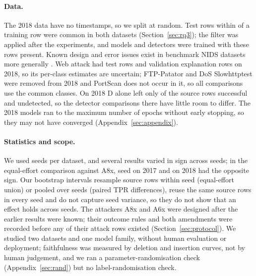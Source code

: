 \paragraph{Data.}
The 2018 data have no timestamps, so we split at random.
Test rows within \paramNDThr{} of a training row were common in both datasets (Section~\ref{sec:rq3}); the filter was
applied after the experiments, and models and detectors were trained with these rows present.
Known design and error issues exist in benchmark NIDS datasets more generally \cite{flood2024,lanvin2022}.
Web attack had \nWebTestEighteen{} test rows and \nWebValEighteen{} validation explanation rows on 2018, so its per-class
estimates are uncertain; FTP-Patator and DoS Slowhttptest were removed from 2018 and PortScan does not occur in it, so
all comparisons use the \nCommonClasses{} common classes.
On 2018 D alone left only \axHeadVoneEighteenD{} of the source rows successful and undetected, so the detector
comparisons there have little room to differ.
The 2018 models ran to the maximum number of epochs without early stopping, so they may not have converged
(Appendix~\ref{sec:appendix}).

\paragraph{Statistics and scope.}
We used \nSeeds{} seeds per dataset, and several results varied in sign across seeds; in the equal-effort comparison
against A8x, \axHeadOppSeedsSeventeen{} seed on 2017 and \axHeadOppSeedsEighteen{} on 2018 had the opposite sign.
Our bootstrap intervals resample source rows within seed (equal-effort union) or pooled over seeds (paired TPR
differences), reuse the same source rows in every seed and do not capture seed variance, so they do not show that an
effect holds across seeds.
The attackers A8x and A6x were designed after the earlier results were known; their outcome rules and both amendments
were recorded before any of their attack rows existed (Section~\ref{sec:protocol}).
We studied two datasets and one model family, without human evaluation or deployment; faithfulness was measured by
deletion and insertion curves, not by human judgement, and we ran a parameter-randomisation check
(Appendix~\ref{sec:rand}) but no label-randomisation check.
